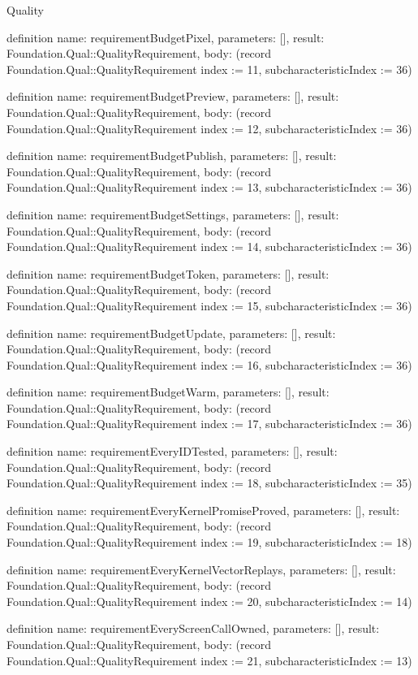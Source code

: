 \begin{lexlean}{Quality}
\begin{semanticmodule}
definition{
  name: requirementBudgetPixel,
  parameters: [],
  result: Foundation.Qual::QualityRequirement,
  body: (record Foundation.Qual::QualityRequirement {index := 11, subcharacteristicIndex := 36})
}

definition{
  name: requirementBudgetPreview,
  parameters: [],
  result: Foundation.Qual::QualityRequirement,
  body: (record Foundation.Qual::QualityRequirement {index := 12, subcharacteristicIndex := 36})
}

definition{
  name: requirementBudgetPublish,
  parameters: [],
  result: Foundation.Qual::QualityRequirement,
  body: (record Foundation.Qual::QualityRequirement {index := 13, subcharacteristicIndex := 36})
}

definition{
  name: requirementBudgetSettings,
  parameters: [],
  result: Foundation.Qual::QualityRequirement,
  body: (record Foundation.Qual::QualityRequirement {index := 14, subcharacteristicIndex := 36})
}

definition{
  name: requirementBudgetToken,
  parameters: [],
  result: Foundation.Qual::QualityRequirement,
  body: (record Foundation.Qual::QualityRequirement {index := 15, subcharacteristicIndex := 36})
}

definition{
  name: requirementBudgetUpdate,
  parameters: [],
  result: Foundation.Qual::QualityRequirement,
  body: (record Foundation.Qual::QualityRequirement {index := 16, subcharacteristicIndex := 36})
}

definition{
  name: requirementBudgetWarm,
  parameters: [],
  result: Foundation.Qual::QualityRequirement,
  body: (record Foundation.Qual::QualityRequirement {index := 17, subcharacteristicIndex := 36})
}

definition{
  name: requirementEveryIDTested,
  parameters: [],
  result: Foundation.Qual::QualityRequirement,
  body: (record Foundation.Qual::QualityRequirement {index := 18, subcharacteristicIndex := 35})
}

definition{
  name: requirementEveryKernelPromiseProved,
  parameters: [],
  result: Foundation.Qual::QualityRequirement,
  body: (record Foundation.Qual::QualityRequirement {index := 19, subcharacteristicIndex := 18})
}

definition{
  name: requirementEveryKernelVectorReplays,
  parameters: [],
  result: Foundation.Qual::QualityRequirement,
  body: (record Foundation.Qual::QualityRequirement {index := 20, subcharacteristicIndex := 14})
}

definition{
  name: requirementEveryScreenCallOwned,
  parameters: [],
  result: Foundation.Qual::QualityRequirement,
  body: (record Foundation.Qual::QualityRequirement {index := 21, subcharacteristicIndex := 13})
}


\end{semanticmodule}
\end{lexlean}
